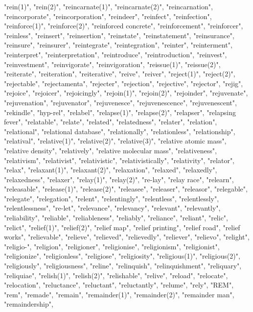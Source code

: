 "rein(1)",
"rein(2)",
"reincarnate(1)",
"reincarnate(2)",
"reincarnation",
"reincorporate",
"reincorporation",
"reindeer",
"reinfect",
"reinfection",
"reinforce(1)",
"reinforce(2)",
"reinforced concrete",
"reinforcement",
"reinforcer",
"reinless",
"reinsert",
"reinsertion",
"reinstate",
"reinstatement",
"reinsurance",
"reinsure",
"reinsurer",
"reintegrate",
"reintegration",
"reinter",
"reinterment",
"reinterpret",
"reinterpretation",
"reintroduce",
"reintroduction",
"reinvest",
"reinvestment",
"reinvigorate",
"reinvigoration",
"reissue(1)",
"reissue(2)",
"reiterate",
"reiteration",
"reiterative",
"reive",
"reiver",
"reject(1)",
"reject(2)",
"rejectable",
"rejectamenta",
"rejecter",
"rejection",
"rejective",
"rejector",
"rejig",
"rejoice",
"rejoicer",
"rejoicingly",
"rejoin(1)",
"rejoin(2)",
"rejoinder",
"rejuvenate",
"rejuvenation",
"rejuvenator",
"rejuvenesce",
"rejuvenescence",
"rejuvenescent",
"rekindle",
"hyp-rel",
"relabel",
"relapse(1)",
"relapse(2)",
"relapser",
"relapsing fever",
"relatable",
"relate",
"related",
"relatedness",
"relater",
"relation",
"relational",
"relational database",
"relationally",
"relationless",
"relationship",
"relatival",
"relative(1)",
"relative(2)",
"relative(3)",
"relative atomic mass",
"relative density",
"relatively",
"relative molecular mass",
"relativeness",
"relativism",
"relativist",
"relativistic",
"relativistically",
"relativity",
"relator",
"relax",
"relaxant(1)",
"relaxant(2)",
"relaxation",
"relaxed",
"relaxedly",
"relaxedness",
"relaxer",
"relay(1)",
"relay(2)",
"re-lay",
"relay race",
"relearn",
"releasable",
"release(1)",
"release(2)",
"releasee",
"releaser",
"releasor",
"relegable",
"relegate",
"relegation",
"relent",
"relentingly",
"relentless",
"relentlessly",
"relentlessness",
"re-let",
"relevance",
"relevancy",
"relevant",
"relevantly",
"reliability",
"reliable",
"reliableness",
"reliably",
"reliance",
"reliant",
"relic",
"relict",
"relief(1)",
"relief(2)",
"relief map",
"relief printing",
"relief road",
"relief works",
"relievable",
"relieve",
"relieved",
"relievedly",
"reliever",
"relievo",
"relight",
"religio-",
"religion",
"religioner",
"religionise",
"religionism",
"religionist",
"religionize",
"religionless",
"religiose",
"religiosity",
"religious(1)",
"religious(2)",
"religiously",
"religiousness",
"reline",
"relinquish",
"relinquishment",
"reliquary",
"reliquiae",
"relish(1)",
"relish(2)",
"relishable",
"relive",
"reload",
"relocate",
"relocation",
"reluctance",
"reluctant",
"reluctantly",
"relume",
"rely",
"REM",
"rem",
"remade",
"remain",
"remainder(1)",
"remainder(2)",
"remainder man",
"remaindership",

